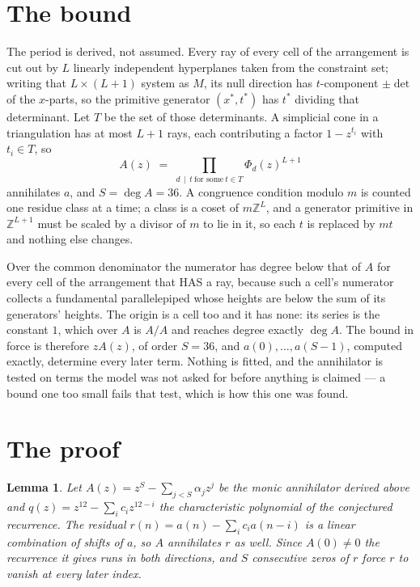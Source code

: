 \documentclass[11pt,a4paper]{article}
\theoremstyle{plain}
\newtheorem{lemma}[theorem]{Lemma}
\theoremstyle{definition}
\begin{document}
\section{The bound}

The period is derived, not assumed. Every ray of every cell of the arrangement is cut out by
$L$ linearly independent hyperplanes taken from the constraint set; writing that $L\times(L+1)$
system as $M$, its null direction has $t$-component $\pm\det$ of the $x$-parts, so the
primitive generator $(x^*,t^*)$ has $t^*$ dividing that determinant. Let $T$ be the set of
those determinants. A simplicial cone in a triangulation has at most $L+1$ rays, each
contributing a factor $1-z^{t_i}$ with $t_i\in T$, so
\[
A(z)\;=\;\prod_{d\,\mid\,t\ \text{for some}\ t\in T}\Phi_d(z)^{L+1}
\]
annihilates $a$, and $S=\deg A=36$. A congruence condition modulo $m$ is counted one residue
class at a time; a class is a coset of $m\mathbb{Z}^L$, and a generator primitive in
$\mathbb{Z}^{L+1}$ must be scaled by a divisor of $m$ to lie in it, so each $t$ is replaced
by $mt$ and nothing else changes.

Over the common denominator the numerator has degree below that of $A$ for every cell of the
arrangement that HAS a ray, because such a cell's numerator collects a fundamental
parallelepiped whose heights are below the sum of its generators' heights. The origin is a cell
too and it has none: its series is the constant $1$, which over $A$ is $A/A$ and reaches degree
exactly $\deg A$. The bound in force is therefore $zA(z)$, of order $S=36$, and
$a(0),\dots,a(S-1)$, computed exactly, determine every later term. Nothing is fitted, and the
annihilator is tested on terms the model was not asked for before anything is claimed --- a
bound one too small fails that test, which is how this one was found.

\section{The proof}

\begin{lemma}\label{lem:crit}
Let $A(z)=z^S-\sum_{j<S}\alpha_jz^{j}$ be the monic annihilator derived above and
$q(z)=z^{12}-\sum_ic_iz^{12-i}$ the characteristic polynomial of the conjectured
recurrence. The residual $r(n)=a(n)-\sum_ic_ia(n-i)$ is a linear combination of shifts of $a$,
so $A$ annihilates $r$ as well. Since $A(0)\ne0$ the recurrence it gives runs in both
directions, and $S$ consecutive zeros of $r$ force $r$ to vanish at every later index.
\end{lemma}
\end{document}
